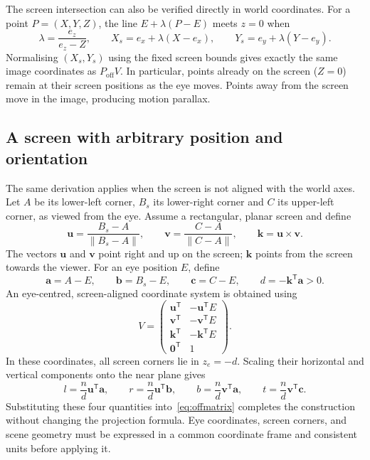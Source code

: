 \documentclass[11pt,a4paper]{article}
\newcommand{\vect}[1]{\boldsymbol{#1}}
\numberwithin{equation}{section}
\begin{document}
The screen intersection can also be verified directly in world coordinates. For a point $P=(X,Y,Z)$, the line $E+\lambda(P-E)$ meets $z=0$ when
\begin{equation}
\lambda=\frac{e_z}{e_z-Z},\qquad
X_s=e_x+\lambda(X-e_x),\qquad
Y_s=e_y+\lambda(Y-e_y).
\end{equation}
Normalising $(X_s,Y_s)$ using the fixed screen bounds gives exactly the same image coordinates as $P_{\mathrm{off}}V$. In particular, points already on the screen ($Z=0$) remain at their screen positions as the eye moves. Points away from the screen move in the image, producing motion parallax.

\newpage
\subsection{A screen with arbitrary position and orientation}
The same derivation applies when the screen is not aligned with the world axes. Let $A$ be its lower-left corner, $B_s$ its lower-right corner and $C$ its upper-left corner, as viewed from the eye. Assume a rectangular, planar screen and define
\begin{equation}
\vect u=\frac{B_s-A}{\|B_s-A\|},\qquad
\vect v=\frac{C-A}{\|C-A\|},\qquad
\vect k=\vect u\times\vect v.
\end{equation}
The vectors $\vect u$ and $\vect v$ point right and up on the screen; $\vect k$ points from the screen towards the viewer. For an eye position $E$, define
\begin{equation}
\vect a=A-E,\qquad \vect b=B_s-E,\qquad \vect c=C-E,\qquad
d=-\vect k^{\mathsf T}\vect a>0.
\end{equation}
An eye-centred, screen-aligned coordinate system is obtained using
\begin{equation}
V=\begin{pmatrix}
\vect u^{\mathsf T}&-\vect u^{\mathsf T}E\\
\vect v^{\mathsf T}&-\vect v^{\mathsf T}E\\
\vect k^{\mathsf T}&-\vect k^{\mathsf T}E\\
\vect 0^{\mathsf T}&1
\end{pmatrix}.
\end{equation}
In these coordinates, all screen corners lie in $z_e=-d$. Scaling their horizontal and vertical components onto the near plane gives
\begin{equation}
l=\frac{n}{d}\vect u^{\mathsf T}\vect a,\qquad
r=\frac{n}{d}\vect u^{\mathsf T}\vect b,\qquad
b=\frac{n}{d}\vect v^{\mathsf T}\vect a,\qquad
t=\frac{n}{d}\vect v^{\mathsf T}\vect c.
\end{equation}
Substituting these four quantities into~\eqref{eq:offmatrix} completes the construction without changing the projection formula. Eye coordinates, screen corners, and scene geometry must be expressed in a common coordinate frame and consistent units before applying it.
\end{document}
